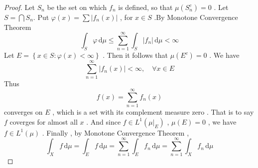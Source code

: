 \documentclass[../main.tex]{subfiles}
\begin{document}
\begin{proof}
   Let \(  S_{n}  \) be the set on which \(  f_{n}  \) is defined, so  that \(  \mu \left( S_{n}^{c} \right)= 0   \)   . Let \(  S= \bigcap S_{n}   \).  Put \(   \varphi \left( x \right)= \sum \left| f_{n}\left( x \right)  \right|     \) , for \(  x \in S  \) .By Monotone Convergence Theorem \[
   \int_{S} \varphi \,\mathrm{d} \mu \le \sum _{n = 1}^{\infty}\int_{S}\left| f_{n} \right|\,\mathrm{d} \mu < \infty 
   \]   Let \(  E= \left\{ x\in S:  \varphi \left( x \right)< \infty  \right\}  \) . Then it follows that   \(  \mu \left( E^{c} \right)= 0   \) .    We have \[
   \sum _{n = 1}^{\infty}\left| f_{n}\left( x \right)  \right|< \infty ,\quad \forall x \in E
   \] Thus \[
   f\left( x \right)= \sum _{n = 1}^{\infty}f_{n}\left( x \right)  
   \] converges on  \(  E  \) , which is a set with its complement measure zero . That is to say \(  f  \) coverges for almost all \(  x  \) . And since \(  f \in L^{1}\left( \mu |_{E} \right)   \) , \(  \mu \left( E \right)= 0   \) , we have \(  f \in L^{1}\left( \mu  \right)   \) .      Finally , by Monotone Convergence Theorem  ,  \[
   \int_{X}f\,\mathrm{d} \mu = \int_{E} f\,\mathrm{d} \mu = \sum _{n = 1}^{\infty}\int_{E}f_{n}\,\mathrm{d} \mu =   \sum _{n = 1}^{\infty}\int_{X}f_{n}\,\mathrm{d} \mu  
   \]
\end{proof}
\end{document}
